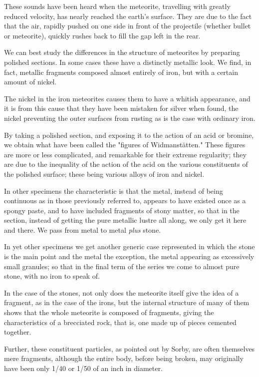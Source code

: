 \documentclass[a4paper, 12pt, oneside, polutonikogreek, english]{article}
\begin{document}
These sounds have been heard when the meteorite, travelling with greatly reduced velocity, has nearly reached the earth's surface. They are due to the fact that the air, rapidly pushed on one side in front of the projectile (whether bullet or meteorite), quickly rushes back to fill the gap left in the rear.

We can best study the differences in the structure of meteorites by preparing polished sections. In some cases these have a distinctly metallic look. We find, in fact, metallic fragments composed almost entirely of iron, but with a certain amount of nickel.

The nickel in the iron meteorites causes them to have a whitish appearance, and it is from this cause that they have been mistaken for silver when found, the nickel preventing the outer surfaces from rusting as is the case with ordinary iron.

By taking a polished section, and exposing it to the action of an acid or bromine, we obtain what have been called the "figures of Widmanstätten." These figures are more or less complicated, and remarkable for their extreme regularity; they are due to the inequality of the action of the acid on the various constituents of the polished surface; these being various alloys of iron and nickel.

In other specimens the characteristic is that the metal, instead of being continuous as in those previously referred to, appears to have existed once as a spongy paste, and to have included fragments of stony matter, so that in the section, instead of getting the pure metallic lustre all along, we only get it here and there. We pass from metal to metal \emph{plus} stone.

In yet other specimens we get another generic case represented in which the stone is the main point and the metal the exception, the metal appearing as excessively small granules; so that in the final term of the series we come to almost pure stone, with no iron to speak of.

In the case of the stones, not only does the meteorite itself give the idea of a fragment, as in the case of the irons, but the internal structure of many of them shows that the whole meteorite is composed of fragments, giving the characteristics of a brecciated rock, that is, one made up of pieces cemented together.

Further, these constituent particles, as pointed out by Sorby, are often themselves mere fragments, although the entire body, before being broken, may originally have been only 1/40 or 1/50 of an inch in diameter.
\end{document}
